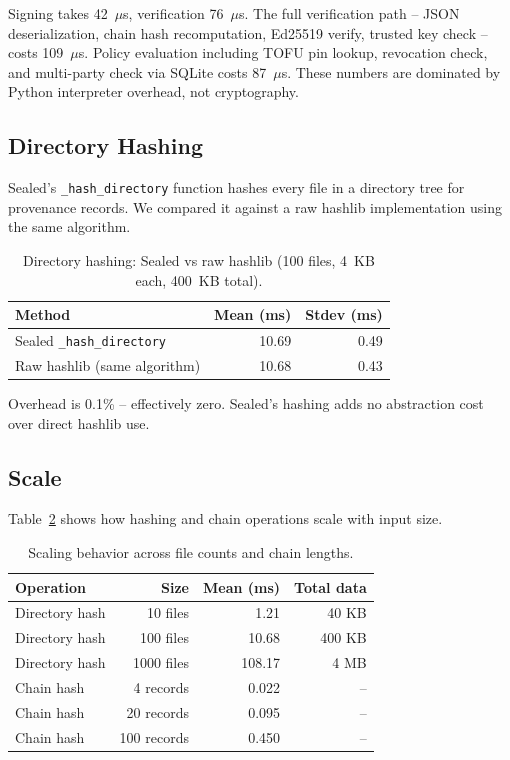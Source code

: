 \documentclass[11pt,a4paper]{article}
\begin{document}
Signing takes 42~$\mu$s, verification 76~$\mu$s. The full verification path -- JSON deserialization, chain hash recomputation, Ed25519 verify, trusted key check -- costs 109~$\mu$s. Policy evaluation including TOFU pin lookup, revocation check, and multi-party check via SQLite costs 87~$\mu$s. These numbers are dominated by Python interpreter overhead, not cryptography.

\subsection{Directory Hashing}

Sealed's \texttt{\_hash\_directory} function hashes every file in a directory tree for provenance records. We compared it against a raw hashlib implementation using the same algorithm.

\begin{table}[h]
\centering
\caption{Directory hashing: Sealed vs raw hashlib (100 files, 4~KB each, 400~KB total).}
\label{tab:hash}
\begin{tabular}{lrr}
\toprule
\textbf{Method} & \textbf{Mean (ms)} & \textbf{Stdev (ms)} \\
\midrule
Sealed \texttt{\_hash\_directory} & 10.69 & 0.49 \\
Raw hashlib (same algorithm) & 10.68 & 0.43 \\
\bottomrule
\end{tabular}
\end{table}

Overhead is 0.1\% -- effectively zero. Sealed's hashing adds no abstraction cost over direct hashlib use.

\subsection{Scale}

Table~\ref{tab:scale} shows how hashing and chain operations scale with input size.

\begin{table}[h]
\centering
\caption{Scaling behavior across file counts and chain lengths.}
\label{tab:scale}
\begin{tabular}{lrrr}
\toprule
\textbf{Operation} & \textbf{Size} & \textbf{Mean (ms)} & \textbf{Total data} \\
\midrule
Directory hash & 10 files & 1.21 & 40 KB \\
Directory hash & 100 files & 10.68 & 400 KB \\
Directory hash & 1000 files & 108.17 & 4 MB \\
\midrule
Chain hash & 4 records & 0.022 & -- \\
Chain hash & 20 records & 0.095 & -- \\
Chain hash & 100 records & 0.450 & -- \\
\bottomrule
\end{tabular}
\end{table}
\end{document}

